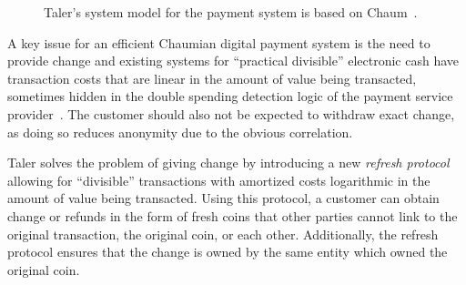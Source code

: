 \documentclass[sigconf, authordraft]{acmart}
\begin{document}
\begin{figure}[h]
\centering
{}
\caption{Taler's system model for the payment system is based on Chaum~\cite{chaum1983blind}.}
\label{fig:cmm}
\end{figure}

A key issue for an efficient Chaumian digital payment system is the
need to provide change and existing systems for ``practical
divisible'' electronic cash have transaction costs that are linear in
the amount of value being transacted, sometimes hidden in the double
spending detection logic of the payment service
provider~\cite{martens2015practical}.  The customer should also not be
expected to withdraw exact change, as doing so reduces anonymity due
to the obvious correlation.

Taler solves the problem of giving change by introducing a new {\em
  refresh protocol} allowing for ``divisible'' transactions with
amortized costs logarithmic in the amount of value being transacted.
Using this protocol, a customer can obtain change or refunds in the
form of fresh coins that other parties cannot link to the original
transaction, the original coin, or each other.  Additionally, the
refresh protocol ensures that the change is owned by the same entity
which owned the original coin.


\end{document}
